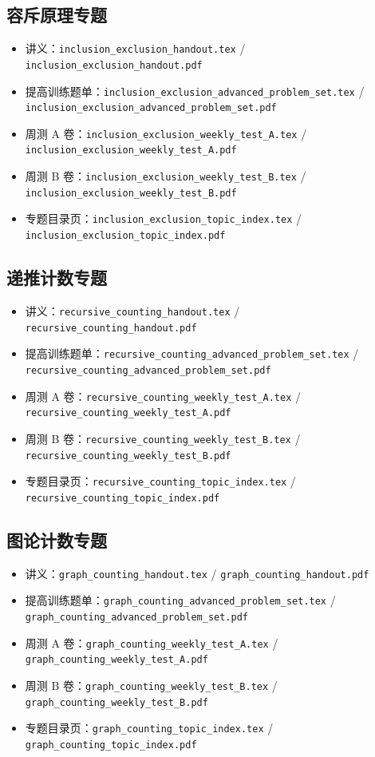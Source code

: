 \documentclass[11pt,a4paper,fontset=fandol]{ctexart}
\begin{document}
\subsection{容斥原理专题}
\begin{itemize}
  \item 讲义：\texttt{inclusion\_exclusion\_handout.tex} / \texttt{inclusion\_exclusion\_handout.pdf}
  \item 提高训练题单：\texttt{inclusion\_exclusion\_advanced\_problem\_set.tex} / \texttt{inclusion\_exclusion\_advanced\_problem\_set.pdf}
  \item 周测 A 卷：\texttt{inclusion\_exclusion\_weekly\_test\_A.tex} / \texttt{inclusion\_exclusion\_weekly\_test\_A.pdf}
  \item 周测 B 卷：\texttt{inclusion\_exclusion\_weekly\_test\_B.tex} / \texttt{inclusion\_exclusion\_weekly\_test\_B.pdf}
  \item 专题目录页：\texttt{inclusion\_exclusion\_topic\_index.tex} / \texttt{inclusion\_exclusion\_topic\_index.pdf}
\end{itemize}

\subsection{递推计数专题}
\begin{itemize}
  \item 讲义：\texttt{recursive\_counting\_handout.tex} / \texttt{recursive\_counting\_handout.pdf}
  \item 提高训练题单：\texttt{recursive\_counting\_advanced\_problem\_set.tex} / \texttt{recursive\_counting\_advanced\_problem\_set.pdf}
  \item 周测 A 卷：\texttt{recursive\_counting\_weekly\_test\_A.tex} / \texttt{recursive\_counting\_weekly\_test\_A.pdf}
  \item 周测 B 卷：\texttt{recursive\_counting\_weekly\_test\_B.tex} / \texttt{recursive\_counting\_weekly\_test\_B.pdf}
  \item 专题目录页：\texttt{recursive\_counting\_topic\_index.tex} / \texttt{recursive\_counting\_topic\_index.pdf}
\end{itemize}

\subsection{图论计数专题}
\begin{itemize}
  \item 讲义：\texttt{graph\_counting\_handout.tex} / \texttt{graph\_counting\_handout.pdf}
  \item 提高训练题单：\texttt{graph\_counting\_advanced\_problem\_set.tex} / \texttt{graph\_counting\_advanced\_problem\_set.pdf}
  \item 周测 A 卷：\texttt{graph\_counting\_weekly\_test\_A.tex} / \texttt{graph\_counting\_weekly\_test\_A.pdf}
  \item 周测 B 卷：\texttt{graph\_counting\_weekly\_test\_B.tex} / \texttt{graph\_counting\_weekly\_test\_B.pdf}
  \item 专题目录页：\texttt{graph\_counting\_topic\_index.tex} / \texttt{graph\_counting\_topic\_index.pdf}
\end{itemize}
\end{document}
